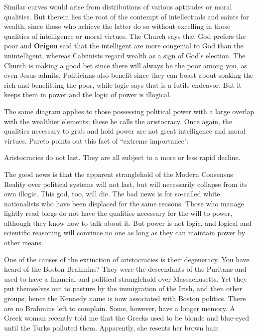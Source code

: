 Similar curves would arise from distributions of various aptitudes or moral qualities. But therein lies the root of the contempt of intellectuals and saints for wealth, since those who achieve the latter do so without excelling in those qualities of intelligence or moral virtues. The Church says that God prefers the poor and \textbf{Origen} said that the intelligent are more congenial to God than the unintelligent, whereas Calvinists regard wealth as a sign of God's election. The Church is making a good bet since there will always be the poor among you, as even Jesus admits. Politicians also benefit since they can boast about soaking the rich and benefitting the poor, while logic says that is a futile endeavor. But it keeps them in power and the logic of power is illogical.

The same diagram applies to those possessing political power with a large overlap with the wealthier elements; these he calls the aristocracy. Once again, the qualities necessary to grab and hold power are not great intelligence and moral virtues. Pareto points out this fact of ``extreme importance": 

\begin{quotex}
Aristocracies do not last. They are all subject to a more or less rapid decline. 

\end{quotex}
The good news is that the apparent stranglehold of the Modern Consensus Reality over political systems will not last, but will necessarily collapse from its own illogic. This god, too, will die. The bad news is for so-called white nationalists who have been displaced for the same reasons. Those who manage lightly read blogs do not have the qualities necessary for the will to power, although they know how to talk about it. But power is not logic, and logical and scientific reasoning will convince no one as long as they can maintain power by other means.

One of the causes of the extinction of aristocracies is their degeneracy. You have heard of the Boston Brahmins? They were the descendants of the Puritans and used to have a financial and political stranglehold over Massachusetts. Yet they put themselves out to pasture by the immigration of the Irish, and then other groups; hence the Kennedy name is now associated with Boston politics. There are no Brahmins left to complain. Some, however, have a longer memory. A Greek woman recently told me that the Greeks used to be blonde and blue-eyed until the Turks polluted them. Apparently, she resents her brown hair.

